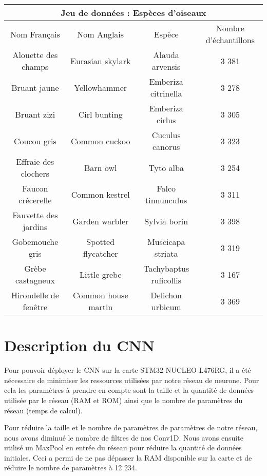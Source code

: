 \begin{center}
  \begin{tabular}{ |c|c|c|c| }
   \hline
   \multicolumn{4}{|c|}{Jeu de données : Espèces d'oiseaux} \\
   \hline
    Nom Français & Nom Anglais & Espèce & Nombre d'échantillons\\
   \hline
    Alouette des champs & Eurasian skylark & Alauda arvensis & 3 381\\
    Bruant jaune & Yellowhammer & Emberiza citrinella & 3 278\\
    Bruant zizi & Cirl bunting & Emberiza cirlus & 3 305\\
    Coucou gris & Common cuckoo & Cuculus canorus & 3 323\\
    Effraie des clochers & Barn owl & Tyto alba & 3 254\\
    Faucon crécerelle & Common kestrel & Falco tinnunculus & 3 311\\
    Fauvette des jardins & Garden warbler & Sylvia borin & 3 398\\
    Gobemouche gris & Spotted flycatcher & Muscicapa striata & 3 319\\
    Grèbe castagneux & Little grebe & Tachybaptus ruficollis & 3 167\\
    Hirondelle de fenêtre & Common house martin & Delichon urbicum & 3 369\\
   \hline
  \end{tabular}
\end{center}

\section{Description du CNN}

Pour pouvoir déployer le CNN sur la carte STM32 NUCLEO-L476RG, il a été nécessaire 
de minimiser les ressources utilisées par notre réseau de neurone. Pour cela les paramètres à prendre en compte sont
la taille et la quantité de données utilisée par le réseau (RAM et ROM) ainsi que le nombre 
de paramètres du réseau (temps de calcul).

Pour réduire la taille et le nombre de paramètres de paramètres de notre réseau, nous avons diminué le nombre de filtres de nos
Conv1D. Nous avons ensuite utilisé un MaxPool en entrée du réseau pour réduire la quantité de données initiales. 
Ceci a permi de ne pas dépasser la RAM disponible sur la carte et de réduire le nombre de paramètres à 12 234.

